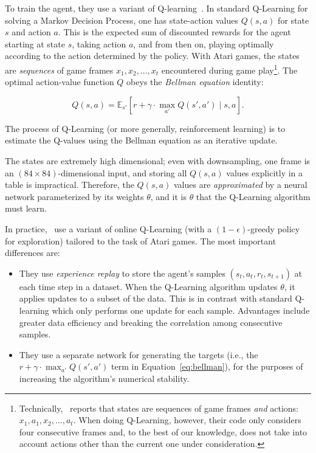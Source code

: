 \documentclass[letterpaper, 10 pt, conference]{ieeeconf}  %
\begin{document}
To train the agent, they use a variant of Q-learning~\cite{Sutton_1998}. In standard Q-Learning for
solving a Markov Decision Process, one has state-action values $Q(s,a)$ for state $s$ and action
$a$. This is the expected sum of discounted rewards for the agent starting at state $s$, taking
action $a$, and from then on, playing optimally according to the action determined by the policy.
With Atari games, the states are \emph{sequences} of game frames $x_1,x_2,\ldots,x_t$ encountered
during game play\footnote{Technically,~\cite{mnih-atari-2013} reports that states are sequences of
game frames \emph{and} actions: $x_1,a_1,x_2,\ldots,a_t$. When doing Q-Learning, however, their code
only considers four consecutive frames and, to the best of our knowledge, does not take into account
actions other than the current one under consideration.}. The optimal action-value function $Q$
obeys the \emph{Bellman equation} identity: 

\begin{equation}\label{eq:bellman}
Q(s,a) = \mathbb{E}_{s'}\left[r + \gamma \cdot \max_{a'} Q(s',a') \mid s,a \right].
\end{equation}

The process of Q-Learning (or more generally, reinforcement learning) is to estimate the Q-values
using the Bellman equation as an iterative update.

The states are extremely high dimensional; even with downsampling, one frame is an $(84\times
84)$-dimensional input, and storing all $Q(s,a)$ values explicitly in a table is impractical.
Therefore, the $Q(s,a)$ values are \emph{approximated} by a neural network parameterized by its
weights $\theta$, and it is $\theta$ that the Q-Learning algorithm must learn.

In practice,~\cite{mnih-dqn-2015} use a variant of online Q-Learning (with a $(1-\epsilon)$-greedy
policy for exploration) tailored to the task of Atari games.  The most important differences are:

\begin{itemize}
    \item They use \emph{experience replay} to store the agent's samples $(s_t,a_t,r_t,s_{t+1})$ at
    each time step in a dataset. When the Q-Learning algorithm updates $\theta$, it applies updates
    to a subset of the data. This is in contrast with standard Q-learning which only performs one
    update for each sample. Advantages include greater data efficiency and breaking the correlation
    among consecutive samples.
    \item They use a separate network for generating the targets (i.e., the $r + \gamma \cdot
    \max_{a'}Q(s',a')$ term in Equation~\ref{eq:bellman}), for the purposes of increasing the
    algorithm's numerical stability.
\end{itemize}
\end{document}
